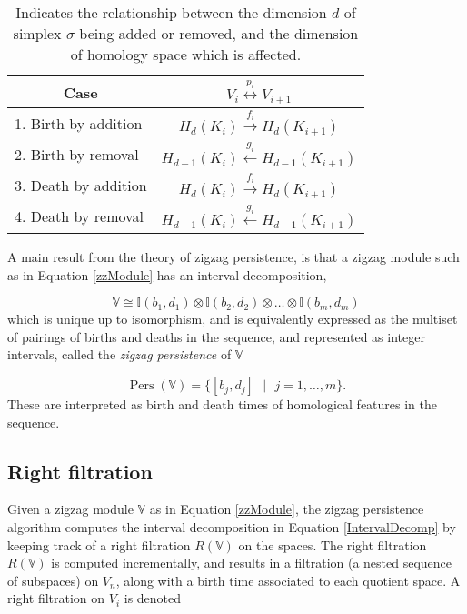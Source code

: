 \documentclass[12pt]{article}
\DeclareMathOperator{\Pers}{Pers}
\begin{document}
\vspace{2mm}
\begin{table}
\begin{center}
\begin{tabular}{|l|c|}
\hline
\multicolumn{1}{|c|}{Case} & $V_i \overset{p_i}{\longleftrightarrow} V_{i+1}$ \\
\hline
1. Birth by addition & $H_d(K_i) \overset{f_i}{\longrightarrow} H_d(K_{i+1})$ \\
2. Birth by removal & $H_{d-1}(K_i) \overset{g_i}{\longleftarrow} H_{d-1}(K_{i+1})$ \\
3. Death by addition & $H_{d}(K_i) \overset{f_i}{\longrightarrow} H_{d}(K_{i+1})$ \\
4. Death by removal & $H_{d-1}(K_i) \overset{g_i}{\longleftarrow} H_{d-1}(K_{i+1})$ \\
\hline
\end{tabular}
\caption{Indicates the relationship between the dimension $d$ of simplex $\sigma$ being added or removed, and the dimension of homology space which is affected. \label{DimTable}}
\end{center}
\end{table}
\vspace{2mm}

A main result from the theory of zigzag persistence, is that a zigzag module such as in Equation \ref{zzModule} has an interval decomposition,

\begin{equation}\label{IntervalDecomp}
\mathbb{V} \cong \mathbb{I}(b_1,d_1) \otimes \mathbb{I}(b_2,d_2) \otimes \ldots \otimes \mathbb{I}(b_m,d_m)
\end{equation}
which is unique up to isomorphism, and is equivalently expressed as the multiset of pairings of births and deaths in the sequence, and represented as integer intervals, called the \emph{zigzag persistence} of $\mathbb{V}$ \cite{carlsson2010}

\begin{equation}\label{bdpairs}
\Pers(\mathbb{V}) = \{[b_j,d_j] \mbox{ } | \mbox{ } j = 1,\ldots,m \}.
\end{equation}
These are interpreted as birth and death times of homological features in the sequence.

\subsection{Right filtration}

Given a zigzag module $\mathbb{V}$ as in Equation \ref{zzModule}, the zigzag persistence algorithm \cite{carlsson2009b} computes the interval decomposition in Equation \ref{IntervalDecomp} by keeping track of a right filtration $R(\mathbb{V})$ on the spaces. The right filtration $R(\mathbb{V})$ is computed incrementally, and results in a filtration (a nested sequence of subspaces) on $V_n$, along with a birth time associated to each quotient space. A right filtration on $V_i$ is denoted
\end{document}
